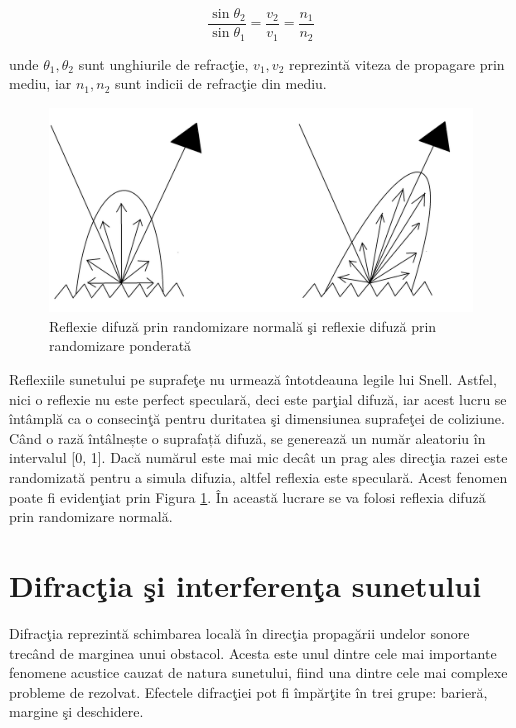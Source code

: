 	\begin{equation}
		\label{SnellEq}
		\frac{\sin \theta_2}{\sin \theta_1} = \frac{v_2}{v_1} = \frac{n_1}{n_2}
	\end{equation}

	\noindent unde $\theta_1, \theta_2$ sunt unghiurile de refrac\c{t}ie, $v_1, v_2$ reprezint\u{a} viteza de propagare prin mediu, iar $n_1, n_2$ sunt indicii de refrac\c{t}ie din mediu.
	
	\begin{figure}[!htb]
		\centering
		\includegraphics[width=0.7\linewidth]{imagini/reflections.png}
		\caption{Reflexie difuz\u{a} prin randomizare normal\u{a} \c{s}i reflexie difuz\u{a} prin randomizare ponderat\u{a}}
		\label{Fig10}
	\end{figure}

	Reflexiile sunetului pe suprafe\c{t}e nu urmeaz\u{a} \^{i}ntotdeauna legile lui Snell. Astfel, nici o reflexie nu este perfect specular\u{a}, deci este par\c{t}ial difuz\u{a}, iar acest lucru se \^{i}nt\^{a}mpl\u{a} ca o consecin\c{t}\u{a} pentru duritatea \c{s}i dimensiunea suprafe\c{t}ei de coliziune. Când o rază întâlnește o
	suprafață difuză, se generează un număr aleatoriu în intervalul [0, 1]. Dac\u{a} num\u{a}rul este mai mic dec\^{a}t un prag ales direc\c{t}ia razei este randomizat\u{a} pentru a simula difuzia, altfel	reflexia este specular\u{a}. Acest fenomen poate fi eviden\c{t}iat prin Figura \ref{Fig10}. \^{I}n aceast\u{a} lucrare se va folosi reflexia difuz\u{a} prin randomizare normal\u{a}.
	


	\section{Difrac\c{t}ia \c{s}i interferen\c{t}a sunetului}
	
	Difrac\c{t}ia reprezint\u{a} schimbarea local\u{a} \^{i}n direc\c{t}ia propag\u{a}rii undelor sonore trec\^{a}nd de marginea unui obstacol. Acesta este unul dintre cele mai importante fenomene acustice cauzat de natura sunetului, fiind una dintre cele mai complexe probleme de rezolvat. Efectele difrac\c{t}iei pot fi \^{i}mp\u{a}r\c{t}ite \^{i}n trei grupe: barier\u{a}, margine \c{s}i deschidere.
	 
